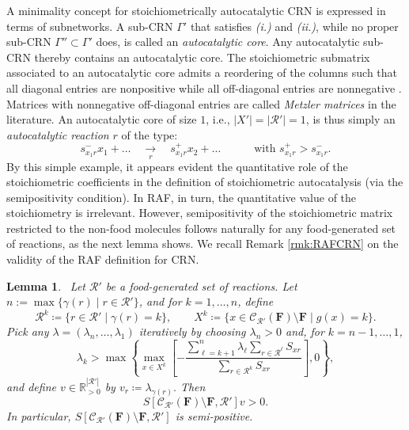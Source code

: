 \documentclass[pdflatex]{sn-jnl}
\theoremstyle{thmstyleone}%
\newtheorem{lemma}[theorem]{Lemma}%
\theoremstyle{examplesty}%
\theoremstyle{thmstylethree}%
\newcommand{\food}{\ensuremath{\mathbf{F}}}
\newcommand{\SM}{S}
\newcommand{\closure}[2]{\mathscr{C}_{#1}(#2)}
\newcommand{\CR}[0]{\mathcal{R}}
\newcommand{\sgen}{g}
\begin{document}
A minimality concept for stoichiometrically autocatalytic CRN is expressed
in terms of subnetworks. A sub-CRN $\Gamma'$ that satisfies \textit{(i.)}
and \textit{(ii.)}, while no proper sub-CRN
$\Gamma''\subset\Gamma'$ %
does, is called an \emph{autocatalytic core}.  Any autocatalytic sub-CRN
thereby contains an autocatalytic core. The stoichiometric submatrix
associated to an autocatalytic core admits a reordering of the columns such
that all diagonal entries are nonpositive while all off-diagonal entries
are nonnegative \cite{blokhuis_Universal_2020, golnik_autocatalytic_2026, 
vassena_unstable_2024}. Matrices with
nonnegative off-diagonal entries are called \emph{Metzler matrices} in the
literature. An autocatalytic core of size $1$, i.e.,
$|X'|=|\mathcal{R}'|=1$, is thus simply an \emph{autocatalytic reaction}
$r$ of the type:
\begin{equation}
    s^-_{x_1r}x_1+\ldots \quad\underset{r}\longrightarrow \quad s^+_{x_1r}x_2+\ldots\quad\quad\quad\text{with $s^+_{x_1r}>s^-_{x_1r}$.}
\end{equation}
By this simple example, it appears evident the quantitative role of the
stoichiometric coefficients in the definition of stoichiometric
autocatalysis (via the semipositivity condition). In RAF, in turn, the
quantitative value of the stoichiometry is irrelevant. However,
semipositivity of the stoichiometric matrix restricted to the non-food
molecules follows naturally for any food-generated set of reactions, as the
next lemma shows. We recall Remark \ref{rmk:RAFCRN} on the validity 
of the RAF definition for CRN.

\vspace{6pt}
\begin{lemma}~\label{lem:NonFoodSemipositiv2}
  Let $\mathcal{R}'$ be a food-generated set of reactions. Let $
  n:=\max\{\gamma(r)\mid r\in\CR'\}$, and for $k=1,\ldots,n$, define
  \begin{equation*}
    \mathcal{R}^k
    \coloneqq
    \{r\in\mathcal{R}'\mid \gamma(r)=k\},
    \qquad
    X^k
    \coloneqq
    \{x\in \closure{\mathcal{R'}}{\food}\setminus\food\mid \sgen(x)=k\}.
  \end{equation*}
  Pick any
  $\lambda=(\lambda_n,\ldots,\lambda_1)$ iteratively by choosing
  $\lambda_n>0$ and, for $k=n-1,\ldots,1$,
  \begin{equation*}
    \lambda_k
    > \max \left\{
      \max_{x\in X^k}
      \left[
        -\frac{
          \displaystyle
          \sum_{\ell=k+1}^{n}
          \lambda_\ell
          \sum_{r\in\mathcal{R}^\ell}\SM_{xr}
        }{
          \displaystyle
          \sum_{r\in\mathcal{R}^k}\SM_{xr}
        }
      \right],0 \right\},
  \end{equation*}
  and define $v\in \mathbb{R}^{|\mathcal{R}'|}_{>0}$ by $
  v_r\coloneqq \lambda_{\gamma(r)}.$
  Then
  \begin{equation*}
    \SM[\closure{\mathcal{R'}}{\food}\setminus\food,\mathcal{R}']v>0.
  \end{equation*}
  In particular,
  $\SM[\closure{\mathcal{R'}}{\food}\setminus\food,\mathcal{R}']$ is
  semi-positive.
\end{lemma}
\end{document}
